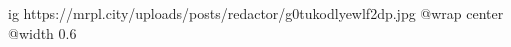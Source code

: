  
 
 
 
 

\ifcmt
  ig https://mrpl.city/uploads/posts/redactor/g0tukodlyewlf2dp.jpg
  @wrap center
  @width 0.6
\fi

